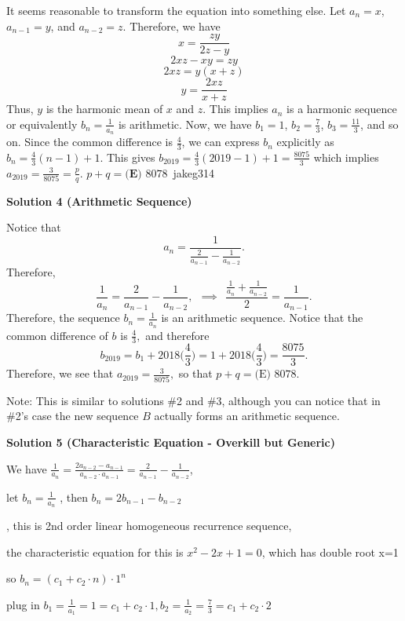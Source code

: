 \begin{enumerate}
It seems reasonable to transform the equation into something else. Let $a_{n}=x$, $a_{n-1}=y$, and $a_{n-2}=z$. Therefore, we have 
 \[x=\frac{zy}{2z-y}\]
 \[2xz-xy=zy\]
 \[2xz=y(x+z)\]
 \[y=\frac{2xz}{x+z}\]Thus, $y$ is the harmonic mean of $x$ and $z$. This implies $a_{n}$ is a harmonic sequence or equivalently $b_{n}=\frac{1}{a_{n}}$ is arithmetic. Now, we have $b_{1}=1$, $b_{2}=\frac{7}{3}$, $b_{3}=\frac{11}{3}$, and so on. Since the common difference is $\frac{4}{3}$, we can express $b_{n}$ explicitly as $b_{n}=\frac{4}{3}(n-1)+1$. This gives $b_{2019}=\frac{4}{3}(2019-1)+1=\frac{8075}{3}$ which implies $a_{2019}=\frac{3}{8075}=\frac{p}{q}$. $p+q=\boxed{\textbf{(E) } 8078}$~jakeg314

 



\textbf{Solution 4 (Arithmetic Sequence)}

Notice that
 \[a_n = \frac{1}{\frac{2}{a_{n-1}} - \frac{1}{a_{n-2}}}.\]Therefore,
 \[\frac{1}{a_n} = \frac{2}{a_{n-1}} - \frac{1}{a_{n-2}}, \ \ \implies \ \ \frac{\frac{1}{a_n} + \frac{1}{a_{n-2}}}{2} = \frac{1}{a_{n-1}}.\]Therefore, the sequence $b_n = \frac{1}{a_n}$ is an arithmetic sequence. Notice that the common difference of $b$ is $\frac{4}{3},$ and therefore
 \[b_{2019} = b_1 + 2018 \bigg(\frac{4}{3}\bigg) = 1 + 2018 \bigg(\frac{4}{3} \bigg) = \frac{8075}{3}.\]Therefore, we see that $a_{2019} = \frac{3}{8075},$ so that $p + q = \boxed{\text{(E) } 8078}.$

 Note: This is similar to solutions \#2 and \#3, although you can notice that in \#2's case the new sequence $B$ actually forms an arithmetic sequence.

 



\textbf{Solution 5 (Characteristic Equation - Overkill but Generic)}

We have $\frac{1}{a_n} = \frac{2a_{n-2}-a_{n-1}}{a_{n-2} \cdot a_{n-1}}=\frac{2}{a_{n-1}}-\frac{1}{a_{n-2}}$, 

 let $b_n = \frac{1}{a_n}$ , then $b_n = 2b_{n-1} - b_{n-2}$ 

 , this is 2nd order linear homogeneous recurrence sequence, 

 the characteristic equation for this is $x^2 -2x +1 = 0$, which has double root x=1

 so $b_n = (c_1 + c_2 \cdot n) \cdot 1^n$

 plug in $b_1 = \frac{1}{a_1} = 1 = c_1 + c_2 \cdot 1, b_2 = \frac{1}{a_2}= \frac{7}{3} =c_1 + c_2 \cdot 2$


\end{enumerate}
